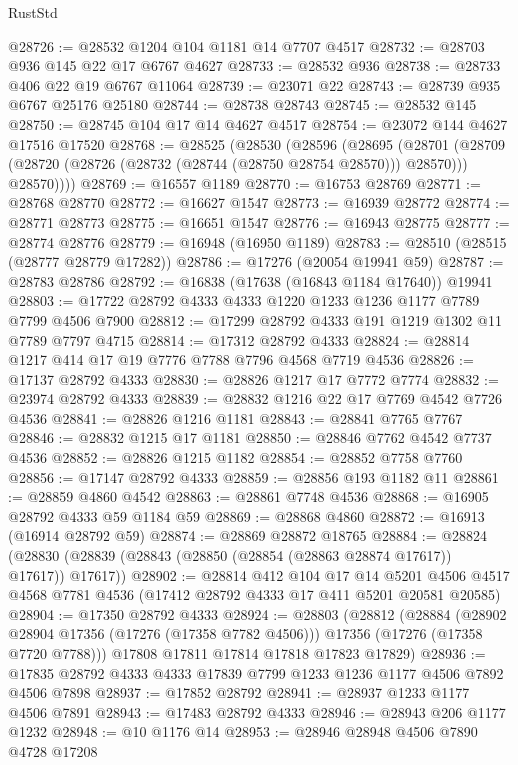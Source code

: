 \begin{lexlean}{RustStd}
\begin{coremodule}
@28726 := @28532 @1204 @104 @1181 @14 @7707 @4517
@28732 := @28703 @936 @145 @22 @17 @6767 @4627
@28733 := @28532 @936
@28738 := @28733 @406 @22 @19 @6767 @11064
@28739 := @23071 @22
@28743 := @28739 @935 @6767 @25176 @25180
@28744 := @28738 @28743
@28745 := @28532 @145
@28750 := @28745 @104 @17 @14 @4627 @4517
@28754 := @23072 @144 @4627 @17516 @17520
@28768 := @28525
    (@28530
      (@28596
        (@28695
          (@28701
            (@28709 (@28720 (@28726 (@28732 (@28744 (@28750 @28754 @28570))) @28570)))
            @28570))))
@28769 := @16557 @1189
@28770 := @16753 @28769
@28771 := @28768 @28770
@28772 := @16627 @1547
@28773 := @16939 @28772
@28774 := @28771 @28773
@28775 := @16651 @1547
@28776 := @16943 @28775
@28777 := @28774 @28776
@28779 := @16948 (@16950 @1189)
@28783 := @28510 (@28515 (@28777 @28779 @17282))
@28786 := @17276 (@20054 @19941 @59)
@28787 := @28783 @28786
@28792 := @16838 (@17638 (@16843 @1184 @17640)) @19941
@28803 := @17722 @28792 @4333 @4333 @1220 @1233 @1236 @1177 @7789 @7799 @4506 @7900
@28812 := @17299 @28792 @4333 @191 @1219 @1302 @11 @7789 @7797 @4715
@28814 := @17312 @28792 @4333
@28824 := @28814 @1217 @414 @17 @19 @7776 @7788 @7796 @4568 @7719 @4536
@28826 := @17137 @28792 @4333
@28830 := @28826 @1217 @17 @7772 @7774
@28832 := @23974 @28792 @4333
@28839 := @28832 @1216 @22 @17 @7769 @4542 @7726 @4536
@28841 := @28826 @1216 @1181
@28843 := @28841 @7765 @7767
@28846 := @28832 @1215 @17 @1181
@28850 := @28846 @7762 @4542 @7737 @4536
@28852 := @28826 @1215 @1182
@28854 := @28852 @7758 @7760
@28856 := @17147 @28792 @4333
@28859 := @28856 @193 @1182 @11
@28861 := @28859 @4860 @4542
@28863 := @28861 @7748 @4536
@28868 := @16905 @28792 @4333 @59 @1184 @59
@28869 := @28868 @4860
@28872 := @16913 (@16914 @28792 @59)
@28874 := @28869 @28872 @18765
@28884 := @28824 (@28830 (@28839 (@28843 (@28850 (@28854 (@28863 @28874 @17617)) @17617)) @17617))
@28902 := @28814
    @412
    @104
    @17
    @14
    @5201
    @4506
    @4517
    @4568
    @7781
    @4536
    (@17412 @28792 @4333 @17 @411 @5201 @20581 @20585)
@28904 := @17350 @28792 @4333
@28924 := @28803
    (@28812
      (@28884
        (@28902 @28904 @17356 (@17276 (@17358 @7782 @4506)))
        @17356
        (@17276 (@17358 @7720 @7788)))
      @17808
      @17811
      @17814
      @17818
      @17823
      @17829)
@28936 := @17835 @28792 @4333 @4333 @17839 @7799 @1233 @1236 @1177 @4506 @7892 @4506 @7898
@28937 := @17852 @28792
@28941 := @28937 @1233 @1177 @4506 @7891
@28943 := @17483 @28792 @4333
@28946 := @28943 @206 @1177 @1232
@28948 := @10 @1176 @14
@28953 := @28946 @28948 @4506 @7890 @4728 @17208

\end{coremodule}
\end{lexlean}
